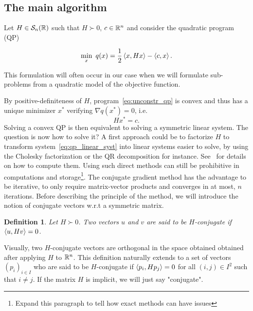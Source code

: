 \documentclass[10pt]{article}
\newtheorem{definition}[theorem]{Definition}
\numberwithin{equation}{section}
\begin{document}
	\subsection{The main algorithm}
	
	Let $H \in {\mathcal{S}}_n({\mathbb{R}})$ such that $H \succ 0$, $c \in {\mathbb{R}}^n$ and consider the quadratic program (QP)
	
	\begin{equation}\label{eq:unconstr_qp}
		\min_x \ q(x) = \dfrac{1}{2} \left\langle {x} , {Hx} \right\rangle - \left\langle {c} , {x} \right\rangle.
	\end{equation}
	
	This formulation will often occur in our case when we will formulate sub-problems from a quadratic model of the objective function.
	
	
	By positive-definiteness of $H$, program~\eqref{eq:unconstr_qp} is convex and thus has a unique minimizer $x^*$ verifying $\nabla q(x^*)=0$, i.e.
	\begin{equation}\label{eq:qp_linear_syst}
		Hx^* = c.
	\end{equation}
	Solving a convex QP is then equivalent to solving a symmetric linear system. The question is now how to solve it? A first approach could be to factorize $H$ to transform system~\eqref{eq:qp_linear_syst} into linear systems easier to solve, by using the Cholesky factorization or the QR decomposition for instance. See~\cite{golubvanloan:2013} for details on how to compute them. Using such direct methods can  still be prohibitive in computations and storage\footnote{Expand this paragraph to tell how exact methods can have issues}. The conjugate gradient method has the advantage to be iterative, to only require matrix-vector products and converges in at most, $n$ iterations. Before describing the principle of the method, we will introduce the notion of conjugate vectors w.r.t a symmetric matrix.
	
	\begin{definition}\label{def:conjugate_vectors}
		Let $H \succ 0$. Two vectors $u$ and $v$ are said to be $H$-conjugate if $\left\langle {u} , {Hv} \right\rangle=0$.
	\end{definition} 
	
	Visually, two $H$-conjugate vectors are orthogonal in the space obtained obtained after applying $H$ to ${\mathbb{R}}^n$. This definition naturally extends to a set of vectors $(p_i)_{i\in I}$ who are said to be $H$-conjugate if $\left\langle {p_i} , {Hp_j} \right\rangle=0$ for all $(i,j) \in I^2$ such that $i\neq j$. If the matrix $H$ is implicit, we will just say "conjugate". 
	
\end{document}
